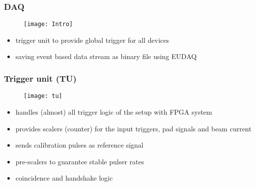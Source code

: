 \begin{frame}
	\frametitle{DAQ}
	\begin{figure}
		\centering
		\texttt{[image: Intro]}
	\end{figure}
	\begin{itemize}
		\item trigger unit to provide global trigger for all devices
		\item saving event based data stream as binary file using EUDAQ
	\end{itemize}
\end{frame}
\begin{frame}
	\frametitle{Trigger unit (TU)}
	\begin{figure}
		\centering
		\texttt{[image: tu]}
	\end{figure}
	\begin{itemize}
		\setlength{\itemsep}{\fill}
		\item handles (almost) all trigger logic of the setup with FPGA system
		\item provides scalers (counter) for the input triggers, pad signals and beam current
		\item sends calibration pulses as reference signal
		\item pre-scalers to guarantee stable pulser rates
		\item coincidence and handshake logic
	\end{itemize}
\end{frame}
